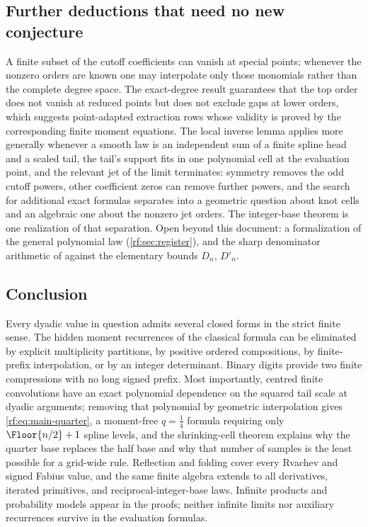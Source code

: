 \documentclass[11pt,oneside]{article}
\theoremstyle{plain}
\theoremstyle{definition}
\theoremstyle{remark}
\begin{document}
\subsection{Further deductions that need no new conjecture}
\label{rf:sec:conclusion-further}

A finite subset of the cutoff coefficients can vanish at special points;
whenever the nonzero orders are known one may interpolate only those
monomials rather than the complete degree space.  The exact-degree result
guarantees that the top order does not vanish at reduced points but does not
exclude gaps at lower orders, which suggests point-adapted extraction rows
whose validity is proved by the corresponding finite moment equations.  The
local inverse lemma applies more generally whenever a smooth law is an
independent sum of a finite spline head and a scaled tail, the tail's
support fits in one polynomial cell at the evaluation point, and the
relevant jet of the limit terminates: symmetry removes the odd cutoff
powers, other coefficient zeros can remove further powers, and the search
for additional exact formulas separates into a geometric question about
knot cells and an algebraic one about the nonzero jet orders.  The
integer-base theorem is one realization of that separation.  Open beyond
this document: a formalization of the general polynomial law
(\cref{rf:sec:register}), and the sharp denominator arithmetic of
\cite{arias2018} against the elementary bounds $D_{n}$, $D'_{n}$.

\subsection{Conclusion}
\label{rf:sec:conclusion-conclusion}

Every dyadic value in question admits several closed forms in the strict
finite sense.  The hidden moment recurrences of the classical formula can
be eliminated by explicit multiplicity partitions, by positive ordered
compositions, by finite-prefix interpolation, or by an integer determinant.
Binary digits provide two finite compressions with no long signed prefix.
Most importantly, centred finite convolutions have an exact polynomial
dependence on the squared tail scale at dyadic arguments; removing that
polynomial by geometric interpolation gives \cref{rf:eq:main-quarter}, a
moment-free $q=\tfrac14$ formula requiring only $\Floor{n/2}+1$ spline
levels, and the shrinking-cell theorem explains why the quarter base
replaces the half base and why that number of samples is the least
possible for a grid-wide rule.  Reflection and folding cover every Rvachev
and signed Fabius value, and the same finite algebra extends to all
derivatives, iterated primitives, and reciprocal-integer-base laws.
Infinite products and probability models appear in the proofs; neither
infinite limits nor auxiliary recurrences survive in the evaluation
formulas.
\end{document}
